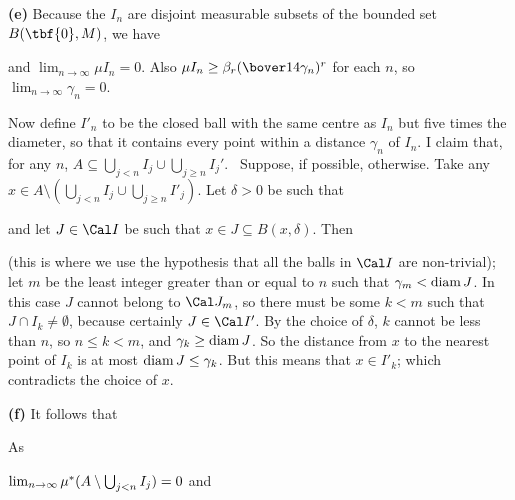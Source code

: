 {\medskip 
      
{\bf (e)} Because the $I_n$ are disjoint measurable subsets of 
the bounded set $B(\tbf{0},M)$, we have 
      
      
\noindent and $\lim_{n\to\infty}\mu I_n=0$.   Also 
$\mu I_n\ge\beta_r(\bover14\gamma_n)^r$ for each $n$, so 
$\lim_{n\to\infty}\gamma_n=0$. 
      
Now define $I'_n$ to be the closed ball with the same centre as $I_n$ 
but five times the diameter, so 
that it contains every point within a distance $\gamma_n$ of $I_n$.   I 
claim that, for any $n$, 
$A\subseteq\bigcup_{j<n}{I}_j\cup\bigcup_{j\ge n}I_j'$. 
\Prf\Quer\ Suppose, if possible, otherwise.   Take any 
$x\in A\setminus(\bigcup_{j<n}{I}_j\cup\bigcup_{j\ge n}I'_j)$.   Let 
$\delta>0$ be such that 
      
      
      
\noindent and let 
$J\in\Cal I$ be such that $x\in J\subseteq B(x,\delta)$.   Then 
      
      
\noindent (this is where we use the hypothesis that all the balls in 
$\Cal I$ are non-trivial);  let $m$ be the least integer 
greater than or equal to $n$ such that $\gamma_m<\mathop{\text{diam}} J$.   In this 
case $J$ cannot belong to $\Cal J_m$, so there must be some $k<m$ such 
that $J\cap I_k\ne\emptyset$, because certainly $J\in\Cal I'$.   By the 
choice of $\delta$, $k$ cannot be less than $n$, so $n\le k<m$, and 
$\gamma_k\ge\mathop{\text{diam}} J$.   So the distance from $x$ to the 
nearest point of $I_k$ is at most $\mathop{\text{diam}} J\le \gamma_k$.   But this 
means 
that $x\in 
I'_k$;  which contradicts the choice of $x$.\ \Bang\Qed 
      
\medskip 
      
{\bf (f)} It follows that 
      
      
\noindent As 
      
      
\noindent $\lim_{n\to\infty}\mu\sp*(A\setminus\bigcup_{j<n}I_j)=0$ and 
      
}
